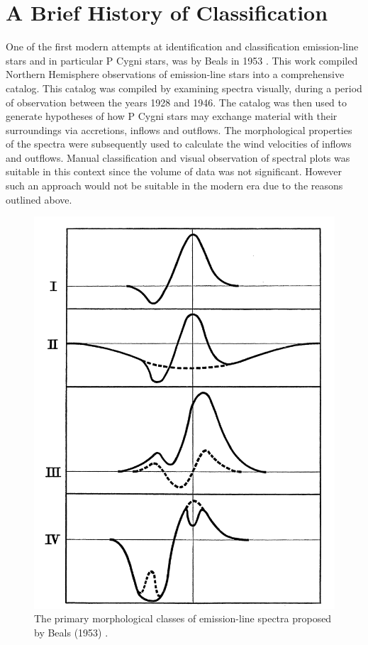 \section{A Brief History of Classification}
One of the first modern attempts at identification and classification emission-line stars and in particular P Cygni stars, was by Beals in 1953 \cite{1953PDAO....9....1B}. This work compiled Northern Hemisphere observations of emission-line stars into a comprehensive catalog. This catalog was compiled by examining spectra visually, during a period of observation between the years 1928 and 1946. The catalog was then used to generate hypotheses of how P Cygni stars may exchange material with their surroundings via accretions, inflows and outflows. The morphological properties of the spectra were subsequently used to calculate the wind velocities of inflows and outflows. Manual classification and visual observation of spectral plots was suitable in this context since the volume of data was not significant. However such an approach would not be suitable in the modern era due to the reasons outlined above.

\begin{figure}[!htb]
\centering
\includegraphics[scale=.30]{figures/beals class 1.png}
\caption{The primary morphological classes of emission-line spectra proposed by Beals (1953) \cite{1953PDAO....9....1B}.}
\end{figure}

